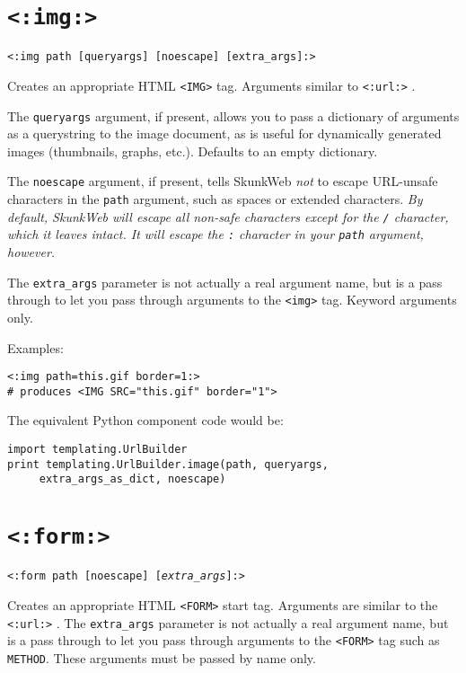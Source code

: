 \documentclass{manual}
\begin{document}
\section{\texttt{<:img:>}}
\label{tagimg}

\begin{verbatim}<:img path [queryargs] [noescape] [extra_args]:>\end{verbatim}

Creates an appropriate HTML \texttt{<IMG>} tag. 
Arguments similar to \texttt{<:url:>} . 

The \texttt{queryargs} argument, if present, allows you to pass a
dictionary of arguments as a querystring to the image document, as
is useful for dynamically generated images (thumbnails, graphs,
etc.). Defaults to an empty dictionary.

The \texttt{noescape} argument, if present,
tells SkunkWeb \emph{not} to escape URL-unsafe characters in the \texttt{path}
argument, such as spaces or extended characters. \emph{By default,
SkunkWeb will escape all non-safe characters except for the \texttt{/}
character, which it leaves intact. It will escape the \texttt{:}
character in your \texttt{path} argument, however.}

The \texttt{extra_args} parameter is not actually a real argument name, 
but is a pass through to let you pass through arguments to 
the \texttt{<img>} tag.  Keyword arguments only.

Examples:

\begin{verbatim}<:img path=this.gif border=1:>
# produces <IMG SRC="this.gif" border="1">
\end{verbatim}

The equivalent Python component code would be:
\begin{verbatim}
import templating.UrlBuilder
print templating.UrlBuilder.image(path, queryargs,
     extra_args_as_dict, noescape)
\end{verbatim}


\section{\texttt{<:form:>}}
\label{tagform}

\texttt{<:form path [noescape] [\emph{extra_args}]:>}

Creates an appropriate HTML \texttt{<FORM>} start tag. 
Arguments are similar to the \texttt{<:url:>} .
The \texttt{extra_args} parameter is not actually a real argument name, but
is a pass through to let you pass through arguments to the
\texttt{<FORM>} 
tag such as \texttt{METHOD}. These arguments must be passed by name only.
\end{document}
